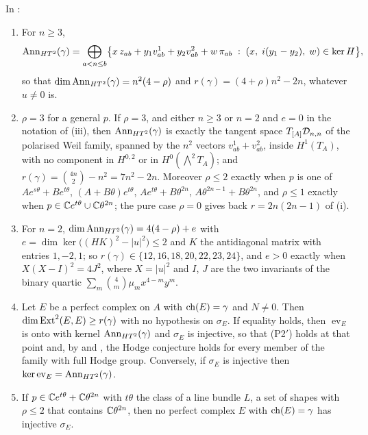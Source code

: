 \begin{theorem}\label{thm:p2primenumber}
In :
\begin{enumerate}[label=\textup{(\roman*)},leftmargin=2.6em,itemsep=2pt]
\item For $n\ge3$,
  \[
    \operatorname{Ann}_{HT^{2}}(\gamma)=\bigoplus_{a<n\le b}
    \bigl\{x\,z_{ab}+y_{1}v^{1}_{ab}+y_{2}v^{2}_{ab}+w\,\pi_{ab}\;:\;
      (x,\;i(y_{1}-y_{2}),\;w)\in\ker H\bigr\},
  \]
  so that $\dim\operatorname{Ann}_{HT^{2}}(\gamma)=n^{2}(4-\rho)$ and
  $r(\gamma)=(4+\rho)n^{2}-2n$, whatever $u\ne0$ is.
\item $\rho=3$ for a general $p$. If $\rho=3$, and either $n\ge3$ or $n=2$ and
  $e=0$ in the notation of (iii), then $\operatorname{Ann}_{HT^{2}}(\gamma)$ is exactly
  the tangent space $T_{[A]}\mathcal{D}_{n,n}$ of the polarised Weil family, spanned
  by the $n^{2}$ vectors $v^{1}_{ab}+v^{2}_{ab}$, inside $H^{1}(T_{A})$, with
  no component in $H^{0,2}$ or in $H^{0}(\bigwedge^{2}T_{A})$; and
  $r(\gamma)=\binom{4n}{2}-n^{2}=7n^{2}-2n$. Moreover $\rho\le2$ exactly when
  $p$ is one of $Ae^{s\theta}+Be^{t\theta}$, $(A+B\theta)e^{t\theta}$,
  $Ae^{t\theta}+B\theta^{2n}$, $A\theta^{2n-1}+B\theta^{2n}$, and $\rho\le1$
  exactly when $p\in\mathbb{C} e^{t\theta}\cup\mathbb{C}\theta^{2n}$; the pure case
  $\rho=0$ gives back $r=2n(2n-1)$ of (i).
\item For $n=2$, $\dim\operatorname{Ann}_{HT^{2}}(\gamma)=4(4-\rho)+e$ with
  $e=\dim\ker\bigl((HK)^{2}-|u|^{2}\bigr)\le2$ and $K$ the antidiagonal
  matrix with entries $1,-2,1$; so $r(\gamma)\in\{12,16,18,20,22,23,24\}$,
  and $e>0$ exactly when $X(X-I)^{2}=4J^{2}$, where $X=|u|^{2}$ and $I$, $J$
  are the two invariants of the binary quartic
  $\sum_{m}\binom{4}{m}\mu_{m}x^{4-m}y^{m}$.
\item Let $E$ be a perfect complex on $A$ with $\operatorname{ch}(E)=\gamma$ and $N\ne0$.
  Then $\dim\operatorname{Ext}^{2}(E,E)\ge r(\gamma)$ with no hypothesis on $\sigma_{E}$.
  If equality holds, then $\operatorname{ev}_{E}$ is onto with kernel
  $\operatorname{Ann}_{HT^{2}}(\gamma)$ and $\sigma_{E}$ is injective, so that
  \textup{(P2$'$)} holds at that point and, by  and
  , the Hodge conjecture holds for every member of
  the family with full Hodge group. Conversely, if $\sigma_{E}$ is injective
  then $\ker\operatorname{ev}_{E}=\operatorname{Ann}_{HT^{2}}(\gamma)$.
\item If $p\in\mathbb{C} e^{t\theta}+\mathbb{C}\theta^{2n}$ with $t\theta$ the class of a line
  bundle $L$, a set of shapes with $\rho\le2$ that contains
  $\mathbb{C}\theta^{2n}$, then no perfect complex $E$ with $\operatorname{ch}(E)=\gamma$ has
  injective $\sigma_{E}$.
\end{enumerate}
\end{theorem}

